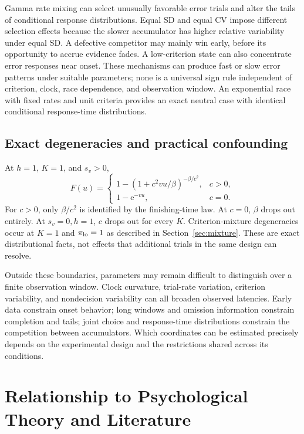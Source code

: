 \documentclass[12pt]{article}
\newcommand{\e}{\mathrm{e}}
\theoremstyle{definition}
\theoremstyle{plain}
\theoremstyle{remark}
\begin{document}
Gamma rate mixing can select unusually favorable error trials and alter the tails of conditional response distributions. Equal SD and equal CV impose different selection effects because the slower accumulator has higher relative variability under equal SD. A defective competitor may mainly win early, before its opportunity to accrue evidence fades. A low-criterion state can also concentrate error responses near onset. These mechanisms can produce fast or slow error patterns under suitable parameters; none is a universal sign rule independent of criterion, clock, race dependence, and observation window. An exponential race with fixed rates and unit criteria provides an exact neutral case with identical conditional response-time distributions.

\subsection{Exact degeneracies and practical confounding}
At $h=1$, $K=1$, and $s_v>0$,
\begin{equation}
 F(u)=
 \begin{cases}
 1-(1+c^2vu/\beta)^{-\beta/c^2},&c>0,\\
 1-\e^{-vu},&c=0.
 \end{cases}\label{eq:unit-confounding}
\end{equation}
For $c>0$, only $\beta/c^2$ is identified by the finishing-time law. At $c=0$, $\beta$ drops out entirely. At $s_v=0,h=1$, $c$ drops out for every $K$. Criterion-mixture degeneracies occur at $K=1$ and $\pi_{\rm lo}=1$ as described in Section~\ref{sec:mixture}. These are exact distributional facts, not effects that additional trials in the same design can resolve.

Outside these boundaries, parameters may remain difficult to distinguish over a finite observation window. Clock curvature, trial-rate variation, criterion variability, and nondecision variability can all broaden observed latencies. Early data constrain onset behavior; long windows and omission information constrain completion and tails; joint choice and response-time distributions constrain the competition between accumulators. Which coordinates can be estimated precisely depends on the experimental design and the restrictions shared across its conditions.

\section{Relationship to Psychological Theory and Literature}\label{sec:theory}
\end{document}
